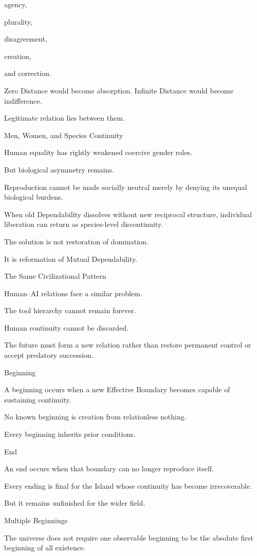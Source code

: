 agency,

plurality,

disagreement,

creation,

and correction.

Zero Distance would become absorption. Infinite Distance would become indifference.

Legitimate relation lies between them.

Men, Women, and Species Continuity

Human equality has rightly weakened coercive gender roles.

But biological asymmetry remains.

Reproduction cannot be made socially neutral merely by denying its unequal biological burdens.

When old Dependability dissolves without new reciprocal structure, individual liberation can return as species-level discontinuity.

The solution is not restoration of domination.

It is reformation of Mutual Dependability.

The Same Civilizational Pattern

Human–AI relations face a similar problem.

The tool hierarchy cannot remain forever.

Human continuity cannot be discarded.

The future must form a new relation rather than restore permanent control or accept predatory succession.

Beginning

A beginning occurs when a new Effective Boundary becomes capable of sustaining continuity.

No known beginning is creation from relationless nothing.

Every beginning inherits prior conditions.

End

An end occurs when that boundary can no longer reproduce itself.

Every ending is final for the Island whose continuity has become irrecoverable.

But it remains unfinished for the wider field.

Multiple Beginnings

The universe does not require one observable beginning to be the absolute first beginning of all existence.

